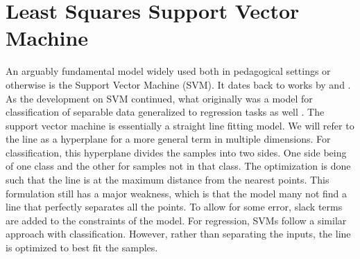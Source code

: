 \section{Least Squares Support Vector Machine}
\noindent An arguably fundamental model widely used both in pedagogical settings or otherwise is the Support Vector Machine (SVM). It dates back to works by \textcite{vapnik1963recognition} and \textcite{vapnik1964perceptron}. As the development on SVM continued, what originally was a model for classification of separable data generalized to regression tasks as well \autocite{vapnikNatureStatisticalLearning2000}. The support vector machine is essentially a straight line fitting model. We will refer to the line as a hyperplane for a more general term in multiple dimensions. For classification, this hyperplane divides the samples into two sides. One side being of one class and the other for samples not in that class. The optimization is done such that the line is at the maximum distance from the nearest points. This formulation still has a major weakness, which is that the model many not find a line that perfectly separates all the points. To allow for some error, slack terms are added to the constraints of the model. For regression, SVMs follow a similar approach with classification. However, rather than separating the inputs, the line is optimized to best fit the samples.

